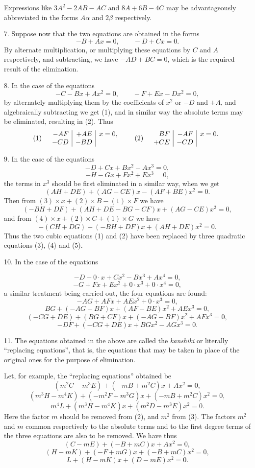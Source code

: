 \documentclass[11pt]{article}
\newcommand{\scanpage}[2]{\clearpage\setcounter{footnote}{0}\noindent{\footnotesize\color{gray}PDF page #1 · #2}\par\medskip}
\newcommand{\scanfooter}{}
\begin{document}
Expressions like $3A^2-2AB-AC$ and $8A+6B-4C$ may be advantageously abbreviated in the forms $A\alpha$ and $2\beta$ respectively.

7. Suppose now that the two equations are obtained in the forms
\[
-B+Ax=0,\qquad -D+Cx=0.
\]
By alternate multiplication, or multiplying these equations by $C$ and $A$ respectively, and subtracting, we have $-AD+BC=0$, which is the required result of the elimination.

8. In the case of the equations
\[
-C-Bx+Ax^2=0,\qquad -F+Ex-Dx^2=0,
\]
by alternately multiplying them by the coefficients of $x^2$ or $-D$ and $+A$, and algebraically subtracting we get (1), and in similar way the absolute terms may be eliminated, resulting in (2). Thus
\[
\begin{array}{c@{\qquad}c}
(1)\quad\begin{array}{r|r|l}
-AF&+AE&x=0,\\
-CD&-BD&
\end{array}
&
(2)\quad\begin{array}{r|r|l}
BF&-AF&x=0.\\
+CE&-CD&
\end{array}
\end{array}
\]

9. In the case of the equations
\[
\tag{1}-D+Cx+Bx^2-Ax^3=0,
\]
\[
\tag{2}-H-Gx+Fx^2+Ex^3=0,
\]
the terms in $x^3$ should be first eliminated in a similar way, when we get
\[
\tag{3}(AH+DE)+(AG-CE)x-(AF+BE)x^2=0.
\]
Then from $(3)\times x+(2)\times B-(1)\times F$ we have
\[
\tag{4}(-BH+DF)+(AH+DE-BG-CF)x+(AG-CE)x^2=0,
\]
and from $(4)\times x+(2)\times C+(1)\times G$ we have
\[
\tag{5}-(CH+DG)+(-BH+DF)x+(AH+DE)x^2=0.
\]
Thus the two cubic equations (1) and (2) have been replaced by three quadratic equations (3), (4) and (5).

10. In the case of the equations
\scanfooter

\scanpage{0209}{Chapter 24, printed page 195}
\[
-D+0\cdot x+Cx^2-Bx^3+Ax^4=0,
\]
\[
-G+Fx+Ex^2+0\cdot x^3+0\cdot x^4=0,
\]
a similar treatment being carried out, the four equations are found:
\[
-AG+AFx+AEx^2+0\cdot x^3=0,
\]
\[
BG+(-AG-BF)x+(AF-BE)x^2+AEx^3=0,
\]
\[
(-CG+DE)+(BG+CF)x+(-AG-BF)x^2+AFx^3=0,
\]
\[
-DF+(-CG+DE)x+BGx^2-AGx^3=0.
\]

11. The equations obtained in the above are called the \emph{kanshiki} or literally ``replacing equations'', that is, the equations that may be taken in place of the original ones for the purpose of elimination.

Let, for example, the ``replacing equations'' obtained be
\[
\tag{1}(m^2C-m^3E)+(-mB+m^2C)x+Ax^2=0,
\]
\[
\tag{2}(m^3H-m^4K)+(-m^2F+m^3G)x+(-mB+m^2C)x^2=0,
\]
\[
\tag{3}m^4L+(m^3H-m^4K)x+(m^2D-m^3E)x^2=0.
\]
Here the factor $m$ should be removed from (2), and $m^2$ from (3). The factors $m^2$ and $m$ common respectively to the absolute terms and to the first degree terms of the three equations are also to be removed. We have thus
\[
\tag{1'}(C-mE)+(-B+mC)x+Ax^2=0,
\]
\[
\tag{2'}(H-mK)+(-F+mG)x+(-B+mC)x^2=0,
\]
\[
\tag{3'}L+(H-mK)x+(D-mE)x^2=0.
\]
\end{document}
